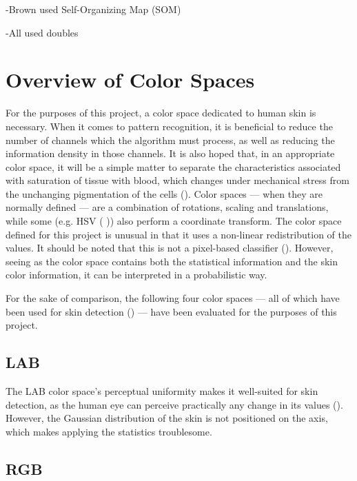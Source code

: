 -Brown used Self-Organizing Map (SOM)

-All used doubles




\section{Overview of Color Spaces}

For the purposes of this project, a color space dedicated to human skin is necessary. When it comes to pattern recognition, it is beneficial to reduce the number of channels which the algorithm must process, as well as reducing the information density in those channels. It is also hoped that, in an appropriate color space, it will be a simple matter to separate the characteristics associated with saturation of tissue with blood, which changes under mechanical stress from the unchanging pigmentation of the cells (\cite{Stamatas2004}). Color spaces --- when they are normally defined --- are a combination of rotations, scaling and translations, while some (e.g. HSV (\cite{Vezhnevets2003, Zarit1999a} )) also perform a coordinate transform. The color space defined for this project is unusual in that it uses a non-linear redistribution of the values. It should be noted that this is not a pixel-based classifier (\cite{Jones2002}). However, seeing as the color space contains both the statistical information and the skin color information, it can be interpreted in a probabilistic way.

For the sake of comparison, the following four color spaces --- all of which have been used for skin detection (\cite{Vezhnevets2003,Zarit1999a,Yang1997a,Brand2000a,Sigal2000a,Chai2000a,Phung2002a}) --- have been evaluated for the purposes of this project.

\subsection{LAB}\label{sec:LAB}

The LAB color space's perceptual uniformity makes it well-suited for skin detection, as the human eye can perceive practically any change in its values (\cite{Vezhnevets2003,Poynton1997}). However, the Gaussian distribution of the skin is not positioned on the axis, which makes applying the statistics troublesome.

\subsection{RGB}\label{sec:RGB}

